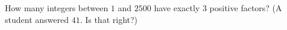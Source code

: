 How many integers between $1$ and $2500$ have exactly $3$ positive factors? (A student answered $41$. Is that right?)

